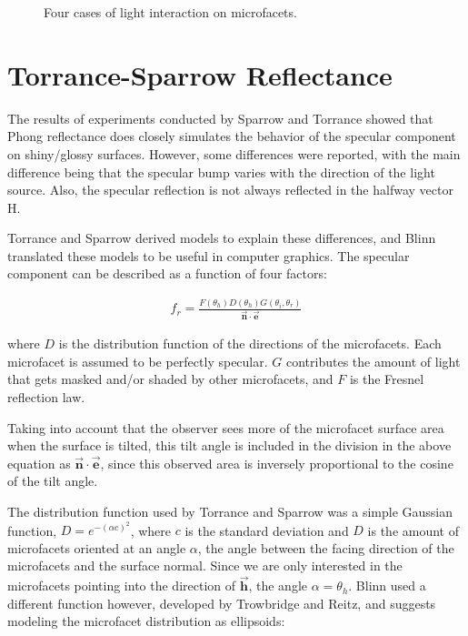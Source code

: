 \begin{figure}[H]
	\begin{center}
	\end{center}
	\caption{Four cases of light interaction on microfacets.}
	\label{fig:GAF}
\end{figure}


\section{Torrance-Sparrow Reflectance}\label{sec:CookTorrance}
	The results of experiments conducted by Sparrow and Torrance \cite{TorranceSparrow} showed that Phong reflectance does closely simulates the behavior of the specular component on shiny/glossy surfaces. However, some differences were reported, with the main difference being that the specular bump varies with the direction of the light source. Also, the specular reflection is not always reflected in the halfway vector H. 

Torrance and Sparrow derived models to explain these differences, and Blinn translated these models to be useful in computer graphics. The specular component can be described as a function of four factors: 
	
	\begin{eqnarray*}
		f_r = \frac{F(\theta_h)D(\theta_h)G(\theta_i,\theta_r)}{\vec{\mathbf{n}} \cdot \vec{\mathbf{e}}}
	\end{eqnarray*}

\noindent where $D$ is the distribution function of the directions of the microfacets. Each microfacet is assumed to be perfectly specular. $G$ contributes the amount of light that gets masked and/or shaded by other microfacets, and $F$ is the Fresnel reflection law.

Taking into account that the observer sees more of the microfacet surface area when the surface is tilted, this tilt angle is included in the division in the above equation as $\vec{\mathbf{n}} \cdot \vec{\mathbf{e}}$, since this observed area is inversely proportional to the cosine of the tilt angle.

The distribution function used by Torrance and Sparrow was a simple Gaussian function, $D = e^{-(\alpha c)^2}$, where $c$ is the standard deviation and $D$ is the amount of microfacets oriented at an angle $\alpha$, the angle between the facing direction of the microfacets and the surface normal. Since we are only interested in the microfacets pointing into the direction of $\vec{\mathbf{h}}$, the angle $\alpha = \theta_h$. Blinn used a different function however, developed by Trowbridge and Reitz, and suggests modeling the microfacet distribution as ellipsoids:

